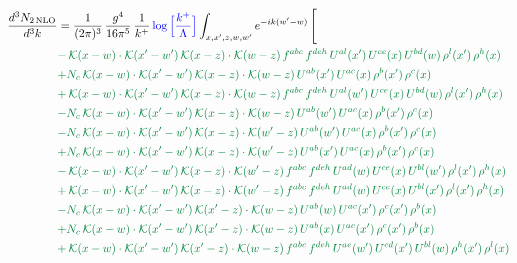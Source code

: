 \documentclass[10pt]{article}
\numberwithin{equation}{section}
\newcommand{\new}[1]{{\color{blue}#1}}
\begin{document}
\begin{align}
\frac{d^{3}N_{2\,\mathrm{NLO}}}{d^{3}k} & = \frac{1}{(2\pi)^{3}}\,\frac{g^{4}}{16\pi^{5}}\,\frac{1}{k^{+}}\,\new{\log\Big[\frac{k^{+}}{\Lambda}\Big]}\int_{x,x',z,w,w'}e^{-ik(w'-w)}\,\Bigg[\notag\\ &{\color{JIM} -\,\mathcal{K}(x-w)\cdot\mathcal{K}(x'-w')\,\mathcal{K}(x-z)\cdot\mathcal{K}(w-z)\,f^{abc}\,f^{deh}\,U^{al}(x')\,U^{ce}(x)\,U^{bd}(w)\,\rho^{l}(x')\,\rho^{h}(x)} \notag\\
&{\color{JIM} +N_{c}\,\mathcal{K}(x-w)\cdot\mathcal{K}(x'-w')\,\mathcal{K}(x-z)\cdot\mathcal{K}(w-z)\,U^{ab}(x')\,U^{ac}(x)\,\rho^{b}(x')\,\rho^{c}(x)} \notag\\
&{\color{JIM} +\,\mathcal{K}(x-w)\cdot\mathcal{K}(x'-w')\,\mathcal{K}(x-z)\cdot\mathcal{K}(w-z)\,f^{abc}\,f^{deh}\,U^{al}(w')\,U^{ce}(x)\,U^{bd}(w)\,\rho^{l}(x')\,\rho^{h}(x)} \notag\\
&{\color{JIM} -N_{c}\,\mathcal{K}(x-w)\cdot\mathcal{K}(x'-w')\,\mathcal{K}(x-z)\cdot\mathcal{K}(w-z)\,U^{ab}(w')\,U^{ac}(x)\,\rho^{b}(x')\,\rho^{c}(x)} \notag\\
&{\color{JIM} -N_{c}\,\mathcal{K}(x-w)\cdot\mathcal{K}(x'-w')\,\mathcal{K}(x-z)\cdot\mathcal{K}(w'-z)\,U^{ab}(w')\,U^{ac}(x)\,\rho^{b}(x')\,\rho^{c}(x)} \notag\\
&{\color{JIM} +N_{c}\,\mathcal{K}(x-w)\cdot\mathcal{K}(x'-w')\,\mathcal{K}(x-z)\cdot\mathcal{K}(w'-z)\,U^{ab}(x')\,U^{ac}(x)\,\rho^{b}(x')\,\rho^{c}(x)} \notag\\
&{\color{JIM} -\,\mathcal{K}(x-w)\cdot\mathcal{K}(x'-w')\,\mathcal{K}(x-z)\cdot\mathcal{K}(w'-z)\,f^{abc}\,f^{deh}\,U^{ad}(w)\,U^{ce}(x)\,U^{bl}(w')\,\rho^{l}(x')\,\rho^{h}(x)} \notag\\
&{\color{JIM} +\,\mathcal{K}(x-w)\cdot\mathcal{K}(x'-w')\,\mathcal{K}(x-z)\cdot\mathcal{K}(w'-z)\,f^{abc}\,f^{deh}\,U^{ad}(w)\,U^{ce}(x)\,U^{bl}(x')\,\rho^{l}(x')\,\rho^{h}(x)} \notag\\
&{\color{JIM} -N_{c}\,\mathcal{K}(x-w)\cdot\mathcal{K}(x'-w')\,\mathcal{K}(x'-z)\cdot\mathcal{K}(w-z)\,U^{ab}(w)\,U^{ac}(x')\,\rho^{c}(x')\,\rho^{b}(x)} \notag\\
&{\color{JIM} +N_{c}\,\mathcal{K}(x-w)\cdot\mathcal{K}(x'-w')\,\mathcal{K}(x'-z)\cdot\mathcal{K}(w-z)\,U^{ab}(x)\,U^{ac}(x')\,\rho^{c}(x')\,\rho^{b}(x)} \notag\\
&{\color{JIM} +\,\mathcal{K}(x-w)\cdot\mathcal{K}(x'-w')\,\mathcal{K}(x'-z)\cdot\mathcal{K}(w-z)\,f^{abc}\,f^{deh}\,U^{ae}(w')\,U^{cd}(x')\,U^{bl}(w)\,\rho^{h}(x')\,\rho^{l}(x)} \notag\\

\end{align}
\end{document}
